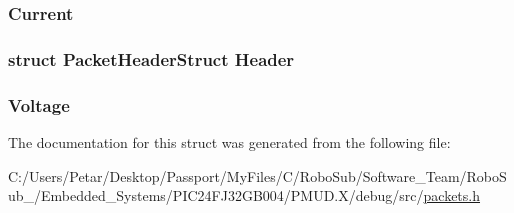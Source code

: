 \subsubsection[{Current}]{ Current}\label{struct_packet_battery_info_get_struct_ace27e048112fedacb5b3b2e1842476d5}
\hypertarget{struct_packet_battery_info_get_struct_ab201af50281aff5ed4f984f994938007}{}
\subsubsection[{Header}]{\setlength{\rightskip}{0pt plus 5cm}struct {\bf Packet\+Header\+Struct} Header}\label{struct_packet_battery_info_get_struct_ab201af50281aff5ed4f984f994938007}
\hypertarget{struct_packet_battery_info_get_struct_a34cd5c2ca0ba84ff82687399f173dcee}{}
\subsubsection[{Voltage}]{ Voltage}\label{struct_packet_battery_info_get_struct_a34cd5c2ca0ba84ff82687399f173dcee}


The documentation for this struct was generated from the following file\+:\begin{DoxyCompactItemize}
\item 
C\+:/\+Users/\+Petar/\+Desktop/\+Passport/\+My\+Files/\+C/\+Robo\+Sub/\+Software\+\_\+\+Team/\+Robo\+Sub\+\_/\+Embedded\+\_\+\+Systems/\+P\+I\+C24\+F\+J32\+G\+B004/\+P\+M\+U\+D.\+X/debug/src/\hyperlink{_p_m_u_d_8_x_2debug_2src_2packets_8h}{packets.\+h}\end{DoxyCompactItemize}
